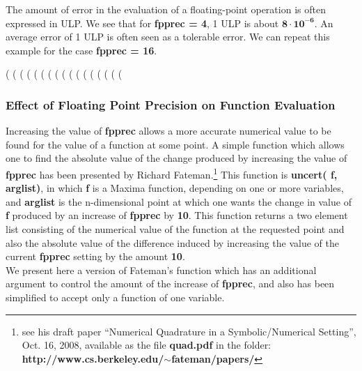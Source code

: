 \documentclass[12pt]{article}
\begin{document}
\noindent The amount of error in the evaluation of a floating-point operation is often 
expressed in ULP. 
We see that for \textbf{fpprec = 4}, 1 ULP is about $\mathbf{8 \cdot 10^{-6}}$.
An average error of 1 ULP is often seen as a tolerable error.
\newpage
\noindent We can repeat this example for the case \textbf{fpprec = 16}.
\begin{myVerbatim}
(%
(%
(%
(%
(%
(%
(%
(%
(%
(%
(%
(%
(%
(%
(%
(%
(%
\end{myVerbatim}   
\subsubsection{Effect of Floating Point Precision on Function Evaluation}  \label{uncert}
Increasing the value of \textbf{fpprec} allows a more accurate numerical value
  to be found for the value of a function at some point.
A simple function which allows one to find the absolute value of the change
  produced by increasing the value of \textbf{fpprec} has been presented by
  Richard Fateman.\footnote{see his draft paper ``Numerical Quadrature in a Symbolic/Numerical
  Setting'', Oct. 16, 2008, available as the file \textbf{quad.pdf} in the folder:
 \textbf{http://www.cs.berkeley.edu/$\mathbf{\sim}$fateman/papers/}} 
This function is \textbf{uncert( f, arglist)}, 
in which \textbf{f} is a Maxima function, depending on one or more variables, and
  \textbf{arglist} is the n-dimensional point at which one wants the change in value
  of \textbf{f} produced by an increase of \textbf{fpprec} by \textbf{10}.
This function returns a two element list consisting of the numerical value
  of the function at the requested point and also the absolute value of the
  difference induced by increasing the value of the current \textbf{fpprec} setting
  by the amount \textbf{10}.\\
  
\noindent We present here a version of Fateman's function which has an additional
  argument to control the amount of the increase of \textbf{fpprec}, and also has
  been simplified to accept only a function of one variable.\\
\end{document}
